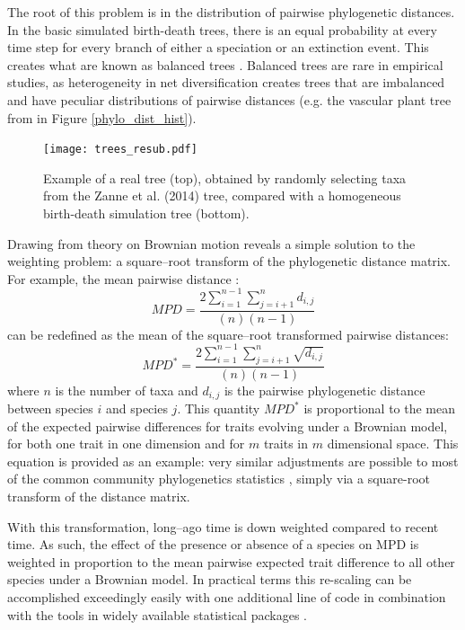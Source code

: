 The root of this problem is in the distribution of pairwise phylogenetic distances.  In the 
basic simulated birth-death trees, there is an equal probability at every time 
step for every branch of either a speciation or an extinction event.  This creates what are known as balanced trees \citep[][also Figure 
\ref{tree_fig}]{heard1997}. Balanced trees are rare in empirical studies, as heterogeneity in net diversification \citep{alfaro2009} creates trees that are imbalanced \citep{mooers1995} and have peculiar distributions of pairwise distances (e.g. the vascular plant tree from \citet{zanne2014} in Figure \ref{phylo_dist_hist}).  

\begin{figure}[H]
\centering
\texttt{[image: trees\_resub.pdf]}
\caption{Example of a real tree (top), obtained by randomly selecting taxa from the Zanne et al. (2014) tree, compared with a 
homogeneous birth-death simulation tree (bottom).}
\label{tree_fig}
\end{figure}

Drawing from theory on Brownian motion reveals a simple solution to the weighting 
problem: a square--root transform of the phylogenetic distance matrix. For 
example, the mean pairwise distance \citep[sensu][]{Webb2000}:
\begin{equation} 
MPD=\frac{2\sum_{i=1}^{n-1} \sum^n_{j=i+1} d_{i,j}}{(n)(n-1)}
\end{equation} 
can be redefined as the mean of the square--root transformed pairwise distances:
\begin{equation} 
MPD^*=\frac{2\sum_{i=1}^{n-1} \sum^n_{j=i+1} \sqrt{d_{i,j}}}{(n)(n-1)}
\end{equation} 
where $n$ is the number of taxa and $d_{i,j}$ is the pairwise phylogenetic 
distance between species $i$ and species $j$. This quantity $MPD^*$ is 
proportional to the mean of the expected pairwise differences for traits 
evolving under a Brownian model, for both one trait in one dimension and for 
$m$ traits in $m$ dimensional space. This equation is provided as an example: 
very similar adjustments are possible to most of the common community 
phylogenetics statistics \citep[see definitions within][]{vellend2010}, simply 
via a square-root transform of the distance matrix.  

With this transformation, long--ago time is down weighted compared to recent 
time. As such, the effect of the presence or absence of a species on MPD
is weighted in proportion to the mean pairwise expected trait difference to all other species under a Brownian model. In practical terms this re-scaling can be accomplished exceedingly 
easily with one additional line of code in combination with the tools in 
widely available statistical packages
\citep{Kembel2010}. 

